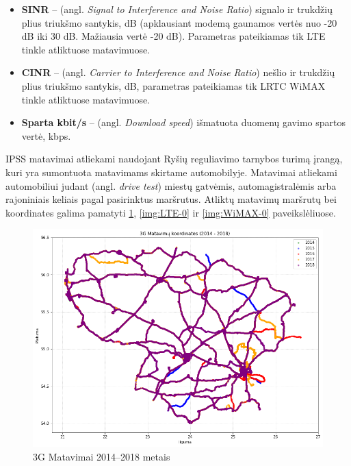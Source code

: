 \documentclass{VUMIFPSbakalaurinis}
\begin{document}
\begin{itemize}
	\item \textbf{SINR} – (angl. \textit{Signal to Interference and Noise Ratio})  signalo ir trukdžių plius triukšmo santykis, dB (apklausiant modemą gaunamos vertės nuo -20 dB iki 30 dB. Mažiausia vertė -20 dB). Parametras pateikiamas tik LTE tinkle atliktuose matavimuose.
	\item \textbf{CINR} – (angl. \textit{Carrier to Interference and Noise Ratio}) nešlio ir trukdžių plius triukšmo santykis, dB, parametras pateikiamas tik LRTC WiMAX tinkle atliktuose matavimuose.
	\item \textbf{Sparta kbit/s} – (angl. \textit{Download speed}) išmatuota duomenų gavimo spartos vertė, kbps.
\end{itemize}
IPSS matavimai atliekami naudojant Ryšių reguliavimo tarnybos turimą įrangą, kuri yra sumontuota matavimams skirtame automobilyje. Matavimai atliekami automobiliui judant (angl. \textit{drive test}) miestų gatvėmis, automagistralėmis arba rajoniniais keliais pagal pasirinktus maršrutus. Atliktų matavimų maršrutų bei koordinates galima pamatyti \ref{img:3G-0}, \ref{img:LTE-0} ir \ref{img:WiMAX-0} paveikslėliuose.
\begin{figure}[H]
	\centering
	\includegraphics[scale=0.5]{img/3G-0}
	\caption{3G Matavimai 2014–2018 metais}
	\label{img:3G-0}
\end{figure}
\end{document}
